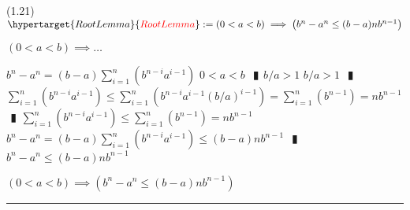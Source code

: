 \documentclass{book}
\newcommand{\df}[1]{\hypertarget{#1}{\textcolor{red}{#1}}}
\newcommand{\abr}{:=}
\newcommand{\pipe}{$\phantom{(}\vrectangleblack\phantom{)}$}
\newcommand{\pr}[1]{\left(#1\right)}
\begin{document}
(1.21) \\
$\df{RootLemma} \abr (0 < a < b) \implies \pr{b^n - a^n \leq (b - a) n b^{n - 1}}$
\begin{enumerate}
  \lit $(0 < a < b) \implies \ldots$
  \begin{enumerate}
    \lit $b^n - a^n = (b - a) \sum_{i = 1}^{n}(b^{n - i} a^{i - 1})$
    \lit $0 < a < b$ \pipe $b / a > 1$
    \lit $b / a > 1$ \pipe $\sum_{i = 1}^{n}(b^{n - i} a^{i - 1}) \leq \sum_{i = 1}^{n}\pr{b^{n - i} a^{i - 1} (b / a)^{i - 1}} = \sum_{i = 1}^{n}(b^{n - 1}) = n b^{n - 1}$ \pipe $\sum_{i = 1}^{n}(b^{n - i} a^{i - 1}) \leq \sum_{i = 1}^{n}(b^{n - 1}) = n b^{n - 1}$
    \lit $b^n - a^n = (b - a) \sum_{i = 1}^{n}(b^{n - i} a^{i - 1}) \leq (b - a) n b^{n - 1}$ \pipe $b^n - a^n \leq (b - a) n b^{n - 1}$
  \end{enumerate}
  \lit $(0 < a < b) \implies \pr{b^n - a^n \leq (b - a) n b^{n - 1}}$
\end{enumerate} \vspace{.75mm} \hrule \vspace{.75mm} \ \\ 
\end{document}
